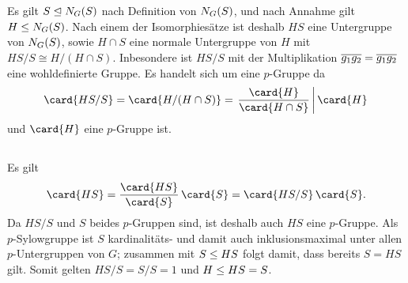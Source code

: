 \section{}





\addtocounter{subsection}{1}





\addtocounter{subsection}{1}





\subsection{}

Es gilt $S \nsubgroup \normalizer{S}{G}$ nach Definition von $\normalizer{S}{G}$, und nach Annahme gilt $H \subgroup \normalizer{S}{G}$.
Nach einem der Isomorphiesätze ist deshalb $HS$ eine Untergruppe von $\normalizer{S}{G}$, sowie $H \cap S$ eine normale Untergruppe von $H$ mit $HS/S \cong H/(H \cap S)$.
Inbesondere ist $HS/S$ mit der Multiplikation $\class{g_1} \class{g_2} = \class{g_1 g_2}$ eine wohldefinierte Gruppe.
Es handelt sich um eine $p$-Gruppe da
\[
                \card{ HS/S }
  =             \card{ H/(H \cap S) }
  = \left.      \frac{ \card{H} }{ \card{H \cap S} }
  \,\middle|\,  \card{H}
    \right.
\]
und $\card{H}$ eine $p$-Gruppe ist.





\subsection{}

Es gilt
\[
    \card{HS}
  = \frac{\card{HS}}{\card{S}} \, \card{S}
  = \card{HS/S} \, \card{S}.
\]
Da $HS/S$ und $S$ beides $p$-Gruppen sind, ist deshalb auch $HS$ eine $p$-Gruppe.
Als $p$-Sylowgruppe ist $S$ kardinalitäts- und damit auch inklusionsmaximal unter allen $p$-Untergruppen von $G$;
zusammen mit $S \subgroup HS$ folgt damit, dass bereits $S = HS$ gilt.
Somit gelten $HS/S = S/S = 1$ und $H \subgroup HS = S$.





\addtocounter{subsection}{1}





\addtocounter{subsection}{1}





\addtocounter{subsection}{1}
